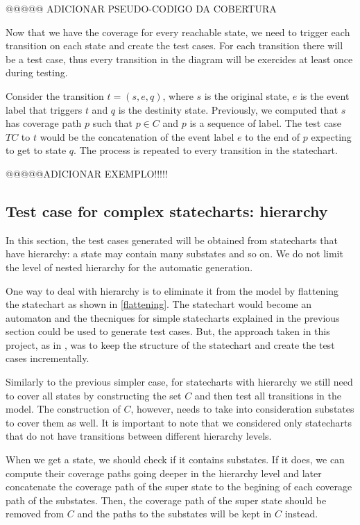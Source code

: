 @@@@@ ADICIONAR PSEUDO-CODIGO DA COBERTURA

Now that we have the coverage for every reachable state, we need to trigger each transition on each state and create the test cases. For each transition there will be a test case, thus every transition in the diagram will be exercides at least once during testing.

Consider the transition $t = (s,e,q)$, where $s$ is the original state, $e$ is the event label that triggers $t$ and $q$ is the destinity state. Previously, we computed that $s$ has coverage path $p$ such that $p \in C$ and $p$ is a sequence of label. The test case $TC$ to $t$ would be the concatenation of the event label $e$ to the end of $p$ expecting to get to state $q$. The process is repeated to every transition in the statechart.

@@@@@ADICIONAR EXEMPLO!!!!!

\subsection{Test case for complex statecharts: hierarchy}

In this section, the test cases generated will be obtained from statecharts that have hierarchy: a state may contain many substates and so on. We do not limit the level of nested hierarchy for the automatic generation.

One way to deal with hierarchy is to eliminate it from the model by flattening the statechart as shown in \ref{flattening}. The statechart would become an automaton and the thecniques for simple statecharts explained in the previous section could be used to generate test cases. But, the approach taken in this project, as in \cite{bogdanov}, was to keep the structure of the statechart and create the test cases incrementally.

Similarly to the previous simpler case, for statecharts with hierarchy we still need to cover all states by constructing the set $C$ and then test all transitions in the model. The construction of $C$, however, needs to take into consideration substates to cover them as well. It is important to note that we considered only statecharts that do not have transitions between different hierarchy levels.

When we get a state, we should check if it contains substates. If it does, we can compute their coverage paths going deeper in the hierarchy level and later concatenate the coverage path of the super state to the begining of each coverage path of the substates. Then, the coverage path of the super state should be removed from $C$ and the paths to the substates will be kept in $C$ instead.

